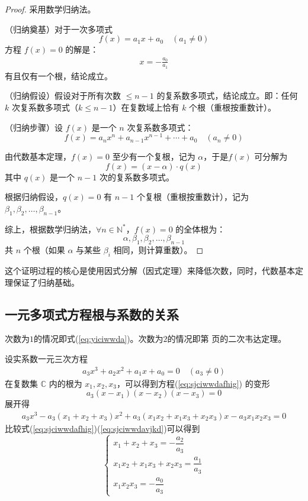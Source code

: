 \documentclass[a4paper,openany]{ctexbook}
\begin{document}
\begin{proof}
    采用数学归纳法。

    （归纳奠基）对于一次多项式
    \[
        f(x) = a_1x + a_0 \quad (a_1 \neq 0)
    \]
    方程 \( f(x) = 0 \) 的解是：
    \begin{gather}
        x = -\frac{a_0}{a_1} \label{eq:yiciwwda}
    \end{gather}
    有且仅有一个根，结论成立。

    （归纳假设）假设对于所有次数 \( \leq n-1 \) 的复系数多项式，结论成立。即：任何 \( k \) 次复系数多项式（\( k \leq n-1 \)）在复数域上恰有 \( k \) 个根（重根按重数计）。

    （归纳步骤）设 \( f(x) \) 是一个 \( n \) 次复系数多项式：
    \[
        f(x) = a_nx^n + a_{n-1}x^{n-1} + \cdots + a_0 \quad (a_n \neq 0)
    \]

    由代数基本定理，\( f(x) = 0 \) 至少有一个复根，记为 \( \alpha \)，于是\(f(x)\) 可分解为
    \[
        f(x) = (x - \alpha) \cdot q(x)
    \]
    其中 \( q(x) \) 是一个 \( n-1 \) 次的复系数多项式。

    根据归纳假设，\( q(x) = 0 \) 有 \( n-1 \) 个复根（重根按重数计），记为 \( \beta_1, \beta_2, \dots, \beta_{n-1} \)。

    综上，根据数学归纳法，\(\forall n\in \mathbb{N^*}\)，\( f(x) = 0 \) 的全体根为：
    \[
        \alpha, \beta_1, \beta_2, \dots, \beta_{n-1}
    \]
    共 \( n \) 个根（如果 \( \alpha \) 与某些 \( \beta_i \) 相同，则计算重数）。
\end{proof}

这个证明过程的核心是使用因式分解（因式定理）来降低次数，同时，代数基本定理保证了归纳基础。

\subsection{一元多项式方程根与系数的关系}

次数为\(1\)的情况即式(\ref{eq:yiciwwda})。次数为\(2\)的情况即第 \pageref{thm:erciwwdadkli} 页的二次韦达定理。

设实系数一元三次方程
\begin{gather}
    a_3x^3+a_2x^2+a_1x+a_0=0 \quad (a_3\ne 0) \label{eq:sjciwwdafhig}
\end{gather}
在复数集 \(\mathbb{C}\) 内的根为 \(x_1,x_2,x_3\)，可以得到方程(\ref{eq:sjciwwdafhig}) 的变形
\[
    a_3(x-x_1)(x-x_2)(x-x_3)=0
\]
展开得
\begin{gather}
    a_3x^3-a_3(x_1+x_2+x_3)x^2+a_3(x_1x_2+x_1x_3+x_2x_3)x-a_3x_1x_2x_3=0 \label{eq:sjciwwdavjkd}
\end{gather}
比较式(\ref{eq:sjciwwdafhig})(\ref{eq:sjciwwdavjkd})可以得到
\[
    \begin{cases}
        x_1+x_2+x_3=-\dfrac{a_2}{a_3}         \\
        x_1x_2+x_1x_3+x_2x_3=\dfrac{a_1}{a_3} \\
        x_1x_2x_3=-\dfrac{a_0}{a_3}
    \end{cases}
\]
\end{document}
